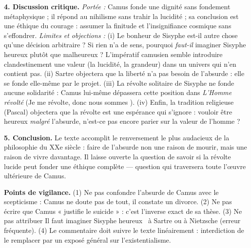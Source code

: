 \documentclass[11pt]{article}
\begin{document}
\begin{corrige}
\textbf{4. Discussion critique.} \emph{Portée :} Camus fonde une dignité sans fondement métaphysique ; il répond au nihilisme sans trahir la lucidité ; sa conclusion est une éthique du courage : assumer la finitude et l'insignifiance cosmique sans s'effondrer. \emph{Limites et objections :} (i) Le bonheur de Sisyphe est-il autre chose qu'une décision arbitraire ? Si rien n'a de sens, pourquoi \emph{faut-il} imaginer Sisyphe heureux plutôt que malheureux ? L'impératif camusien semble introduire clandestinement une valeur (la lucidité, la grandeur) dans un univers qui n'en contient pas. (ii) Sartre objectera que la liberté n'a pas besoin de l'absurde : elle se fonde elle-même par le projet. (iii) La révolte solitaire de Sisyphe ne fonde aucune solidarité : Camus lui-même dépassera cette position dans \emph{L'Homme révolté} (\guillemotleft Je me révolte, donc nous sommes \guillemotright). (iv) Enfin, la tradition religieuse (Pascal) objectera que la révolte est une espérance qui s'ignore : vouloir être heureux \emph{malgré} l'absurde, n'est-ce pas encore parier sur la valeur de l'homme ?

\textbf{5. Conclusion.} Le texte accomplit le renversement le plus audacieux de la philosophie du XXe siècle : faire de l'absurde non une raison de mourir, mais une raison de vivre davantage. Il laisse ouverte la question de savoir si la révolte lucide peut fonder une éthique complète — question qui traversera toute l'œuvre ultérieure de Camus.

\textbf{Points de vigilance.} (1) Ne pas confondre l'absurde de Camus avec le scepticisme : Camus ne doute pas de tout, il constate un divorce. (2) Ne pas écrire que Camus « justifie le suicide » : c'est l'inverse exact de sa thèse. (3) Ne pas attribuer \guillemotleft Il faut imaginer Sisyphe heureux \guillemotright\ à Sartre ou à Nietzsche (erreur fréquente). (4) Le commentaire doit suivre le texte linéairement : interdiction de le remplacer par un exposé général sur l'existentialisme.
\end{corrige}
\end{document}
